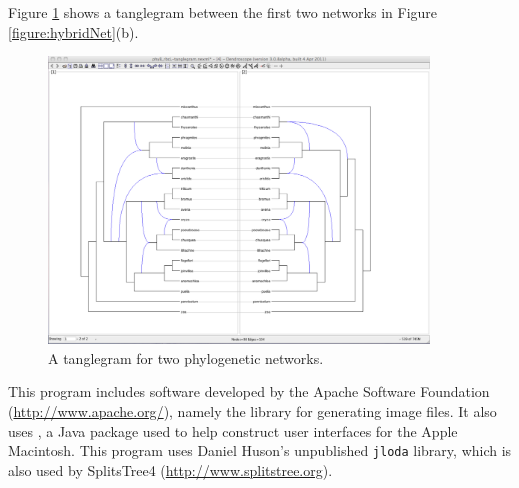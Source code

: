 \documentclass[11pt]{article}
\begin{document}

Figure \ref{figure:tanglegram} shows a tanglegram between the first two networks in Figure \ref{figure:hybridNet}(b).

\begin{figure}[ht] %
\begin{center}
\includegraphics[width=0.9\textwidth]{./figs/phyB_rbcL-hybrid-tanglegram.pdf}
\end{center}	
\caption{\small \sffamily A tanglegram for two phylogenetic networks.}
\label{figure:tanglegram}
\end{figure}






This program includes  software developed  by the  Apache Software Foundation
(\url{http://www.apache.org/}), namely the  library for
generating image files.
It also uses , a Java
package used to help construct user interfaces for the Apple Macintosh.
This program uses Daniel Huson's unpublished {\tt jloda} library, which is also
used by SplitsTree4 (\url{http://www.splitstree.org})\cite{SplitsTree98,HusonBryant2006}.





\printindex
\end{document}

